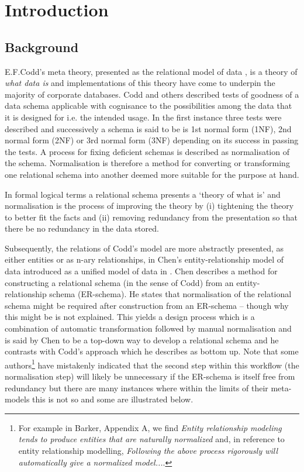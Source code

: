 

\section{Introduction}

\subsection{Background}
E.F.Codd's meta theory, presented as the relational model of data \cite{Codd1970},
 is a theory of \textit{what data is} and implementations of this theory have come to underpin 
the majority of corporate databases.   Codd and others described tests of goodness of a data schema applicable with cognisance to the possibilities among the data that it is designed for i.e. the intended usage.
In the first instance three tests were described and successively a schema is said to be is 1st normal form (1NF), 2nd normal form (2NF) or 3rd normal form (3NF) depending on its success in passing the tests. A process for fixing deficient schemas is described as normalisation of the schema. 
Normalisation is therefore a method for converting or transforming one relational schema into another deemed more suitable for the purpose at hand. 

In formal logical terms a relational schema presents a `theory of what is' and normalisation is the process of improving the theory by (i) tightening the theory to better fit the facts and (ii) removing redundancy from the presentation so that there be no redundancy in the data stored.

Subsequently, the relations of Codd's model are more abstractly presented, as either entities or as n-ary relationships, in Chen's entity-relationship model of data introduced as a unified model of data in \cite{Chen1976}. 
Chen describes a method for constructing 
a relational schema (in the sense of Codd) from an entity-relationship schema (ER-schema).
He states that normalisation of the relational schema might be required after construction from an ER-schema -- though why this might be is not explained. 
This yields a design process which is a combination of automatic transformation followed by manual
normalisation and is said by Chen to be a top-down way to develop a relational schema and  he contrasts with Codd's approach which he describes as bottom up.
Note that some authors\footnote{For example in Barker, Appendix A,  we find \textit{Entity relationship modeling tends to produce entities that are naturally normalized} and, in reference to entity relationship modelling, \textit{Following the above process  rigorously will automatically give a normalized model...}. } have mistakenly indicated that the second step within this workflow 
(the normalisation step) will likely be unnecessary if the ER-schema is itself free from redundancy
but there are many instances where within the limits of their meta-models this is not so and some are illustrated below. 

